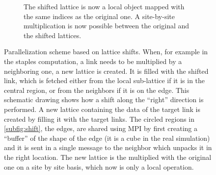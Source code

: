 \begin{figure}[hbt!]
\begin{subfigure}{\textwidth}
        \caption{The shifted lattice is now a local object mapped with the same indices as the original one. A site-by-site multiplication is now possible between the original and the shifted lattices.}
    \end{subfigure}
    \caption{Parallelization scheme based on lattice shifts. When, for example in the staples computation, a link needs to be multiplied by a neighboring one, a new lattice is created. It is filled with the shifted link, which is fetched either from the local sub-lattice if it is in the central region, or from the neighbors if it is on the edge. This schematic drawing shows how a shift along the ``right'' direction is performed. A new lattice containing the data of the target link is created by filling it with the target links. The circled regions in \cref{subfig:shift}, the edges, are shared using MPI by first creating a ``buffer'' of the shape of the edge (it is a cube in the real simulation) and it is sent in a single message to the neighbor which unpacks it in the right location. The new lattice is the multiplied with the original one on a site by site basis, which now is only a local operation.}
    \label{fig:shift}
\end{figure}